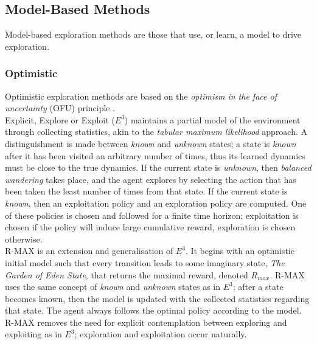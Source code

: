 \subsection{Model-Based Methods}
Model-based exploration methods are those that use, or learn, a model to drive exploration.
\subsubsection{Optimistic}
Optimistic exploration methods are based on the \textit{optimism in the face of uncertainty} (OFU) principle \cite{DBLP:journals/corr/cs-AI-9605103}.
\\Explicit, Explore or Exploit ($E^3$)  \cite{Kearns+Singh:2002} maintains a partial model of the environment through collecting statistics, akin to the \textit{tabular maximum likelihood} approach. A distinguishment is made between \textit{known} and \textit{unknown} states; a state is \textit{known} after it has been visited an arbitrary number of times, thus its learned dynamics must be close to the true dynamics. If the current state is \textit{unknown}, then \textit{balanced wandering} takes place, and the agent explores by selecting the action that has been taken the least number of times from that state. If the current state is \textit{known}, then an exploitation policy and an exploration policy are computed. One of these policies is chosen and followed for a finite time horizon; exploitation is chosen if the policy will induce large cumulative reward, exploration is chosen otherwise.
\\ R-MAX \cite{10.1162/153244303765208377} is an extension and generalisation of $E^3$. It begins with an optimistic initial model such that every transition leads to some imaginary state, \textit{The Garden of Eden State}, that returns the maximal reward, denoted $R_{max}$. R-MAX uses the same concept of \textit{known} and \textit{unknown} states as in $E^3$; after a state becomes known, then the model is updated with the collected statistics regarding that state. The agent always follows the optimal policy according to the model. R-MAX removes the need for explicit contemplation between exploring and exploiting as in $E^3$; exploration and exploitation occur naturally.
